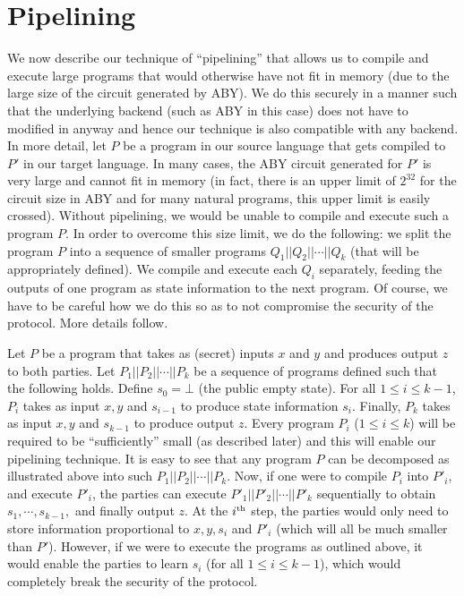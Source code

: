 \section{Pipelining}
\label{sec:pipe}

We now describe our technique of ``pipelining'' that allows us to compile and execute large programs that would otherwise have not fit in memory (due to the large size of the circuit generated by ABY). We do this securely in a manner such that the underlying backend (such as ABY in this case) does not have to modified in anyway and hence our technique is also compatible with any backend. In more detail, let $P$ be a program in our source language that gets compiled to $P'$ in our target language. In many cases, the ABY circuit generated for $P'$ is very large and cannot fit in memory (in fact, there is an upper limit of $2^{32}$ for the circuit size in ABY and for many natural programs, this upper limit is easily crossed). Without pipelining, we would be unable to compile and execute such a program $P$. In order to overcome this size limit, we do the following: we split the program $P$ into a sequence of smaller programs $Q_1||Q_2||\cdots||Q_k$ (that will be appropriately defined). We compile and execute each $Q_i$ separately, feeding the outputs of one program as state information to the next program. Of course, we have to be careful how we do this so as to not compromise the security of the protocol. More details follow.

Let $P$ be a program that takes as (secret) inputs $x$ and $y$ and produces output $z$ to both parties. Let $P_1||P_2||\cdots||P_k$ be a sequence of programs defined such that the following holds. Define $s_0 = \bot$ (the public empty state). For all $1\leq i\leq k-1$, $P_i$ takes as input $x, y$ and $s_{i-1}$ to produce state information $s_i$. Finally, $P_k$ takes as input $x,y$ and $s_{k-1}$ to produce output $z$. Every program $P_i$ ($1\leq i\leq k$) will be required to be ``sufficiently'' small (as described later) and this will enable our pipelining technique. It is easy to see that any program $P$ can be decomposed as illustrated above into such $P_1||P_2||\cdots||P_k$. Now, if one were to compile $P_i$ into $P'_i$, and execute $P'_i$, the parties can execute $P'_1||P'_2||\cdots||P'_k$ sequentially to obtain $s_1,\cdots,s_{k-1},$ and finally output $z$. At the $i^{\textrm{\tiny{th}}}$ step, the parties would only need to store information proportional to $x,y,s_i$ and $P'_i$ (which will all be much smaller than $P'$). However, if we were to execute the programs as outlined above, it would enable the parties to learn $s_i$ (for all $1\leq i\leq k-1$), which would completely break the security of the protocol.


